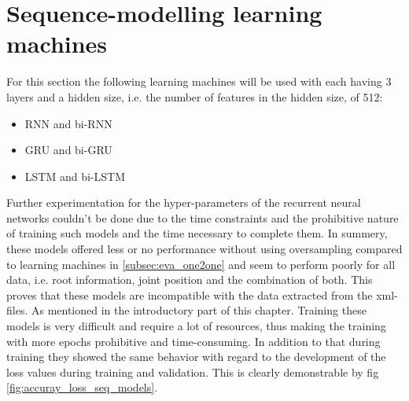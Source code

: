 	\section{Sequence-modelling learning machines}\label{subsec:eve_seq} 
		For this section the following learning machines will be used with each having 3 layers and a hidden size, i.e. the number of features in the hidden size, of 512:
		\begin{itemize}
			\item RNN and bi-RNN
			\item GRU and bi-GRU
			\item LSTM and bi-LSTM
		\end{itemize}
		Further experimentation for the hyper-parameters of the recurrent neural networks couldn't be done due to the time constraints and the prohibitive nature of training such models and the time necessary to complete them. In summery, these models offered less or no performance without using oversampling compared to learning machines in \ref{subsec:eva_one2one} and seem to perform poorly for all data, i.e. root information, joint position and the combination of both. This proves that these models are incompatible with the data extracted from the xml-files. As mentioned in the introductory part of this chapter. Training these models is very difficult and require a lot of resources, thus making the training with more epochs prohibitive and time-consuming. In addition to that during training they showed the same behavior with regard to the development of the loss values during training and validation. This is clearly demonstrable by fig \ref{fig:accuray_loss_seq_models}.
